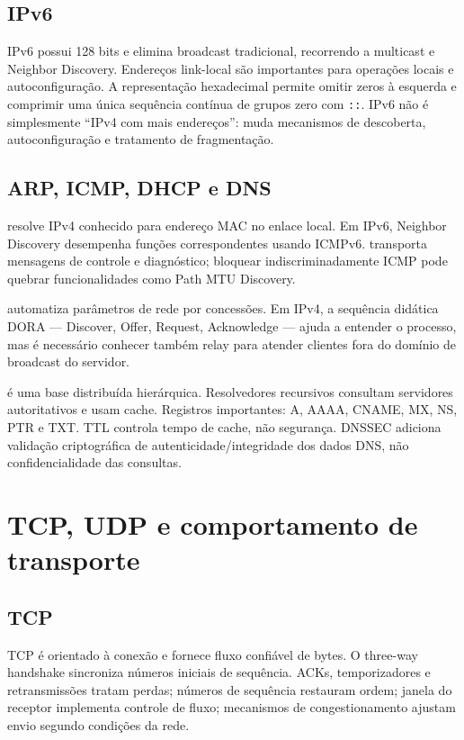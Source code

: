 \subsection{IPv6}

IPv6 possui 128 bits e elimina broadcast tradicional, recorrendo a multicast e Neighbor Discovery. Endereços link-local são importantes para operações locais e autoconfiguração. A representação hexadecimal permite omitir zeros à esquerda e comprimir uma única sequência contínua de grupos zero com \texttt{::}. IPv6 não é simplesmente ``IPv4 com mais endereços'': muda mecanismos de descoberta, autoconfiguração e tratamento de fragmentação.

\subsection{ARP, ICMP, DHCP e DNS}

 resolve IPv4 conhecido para endereço MAC no enlace local. Em IPv6, Neighbor Discovery desempenha funções correspondentes usando ICMPv6.  transporta mensagens de controle e diagnóstico; bloquear indiscriminadamente ICMP pode quebrar funcionalidades como Path MTU Discovery.

 automatiza parâmetros de rede por concessões. Em IPv4, a sequência didática DORA — Discover, Offer, Request, Acknowledge — ajuda a entender o processo, mas é necessário conhecer também relay para atender clientes fora do domínio de broadcast do servidor.

 é uma base distribuída hierárquica. Resolvedores recursivos consultam servidores autoritativos e usam cache. Registros importantes: A, AAAA, CNAME, MX, NS, PTR e TXT. TTL controla tempo de cache, não segurança. DNSSEC adiciona validação criptográfica de autenticidade/integridade dos dados DNS, não confidencialidade das consultas.

\section{TCP, UDP e comportamento de transporte}

\subsection{TCP}

TCP é orientado à conexão e fornece fluxo confiável de bytes. O three-way handshake sincroniza números iniciais de sequência. ACKs, temporizadores e retransmissões tratam perdas; números de sequência restauram ordem; janela do receptor implementa controle de fluxo; mecanismos de congestionamento ajustam envio segundo condições da rede.

